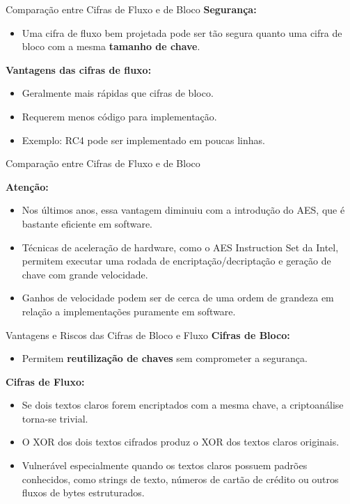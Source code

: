 \begin{frame}{Comparação entre Cifras de Fluxo e de Bloco}
\textbf{Segurança:}
\begin{itemize}
    \item Uma cifra de fluxo bem projetada pode ser tão segura quanto uma cifra de bloco com a mesma \textbf{tamanho de chave}.
\end{itemize}

\textbf{Vantagens das cifras de fluxo:}
\begin{itemize}
    \item Geralmente mais rápidas que cifras de bloco.
    \item Requerem menos código para implementação.
    \item Exemplo: RC4 pode ser implementado em poucas linhas.
\end{itemize}
\end{frame}

\begin{frame}{Comparação entre Cifras de Fluxo e de Bloco}


\textbf{Atenção:}
\begin{itemize}
    \item Nos últimos anos, essa vantagem diminuiu com a introdução do AES, que é bastante eficiente em software.
    \item Técnicas de aceleração de hardware, como o AES Instruction Set da Intel, permitem executar uma rodada de encriptação/decriptação e geração de chave com grande velocidade.
    \item Ganhos de velocidade podem ser de cerca de uma ordem de grandeza em relação a implementações puramente em software.
\end{itemize}
\end{frame}


\begin{frame}{Vantagens e Riscos das Cifras de Bloco e Fluxo}
\textbf{Cifras de Bloco:}
\begin{itemize}
    \item Permitem \textbf{reutilização de chaves} sem comprometer a segurança.
\end{itemize}

\textbf{Cifras de Fluxo:}
\begin{itemize}
    \item Se dois textos claros forem encriptados com a mesma chave, a criptoanálise torna-se trivial.
    \item O XOR dos dois textos cifrados produz o XOR dos textos claros originais.
    \item Vulnerável especialmente quando os textos claros possuem padrões conhecidos, como strings de texto, números de cartão de crédito ou outros fluxos de bytes estruturados.
\end{itemize}
\end{frame}

